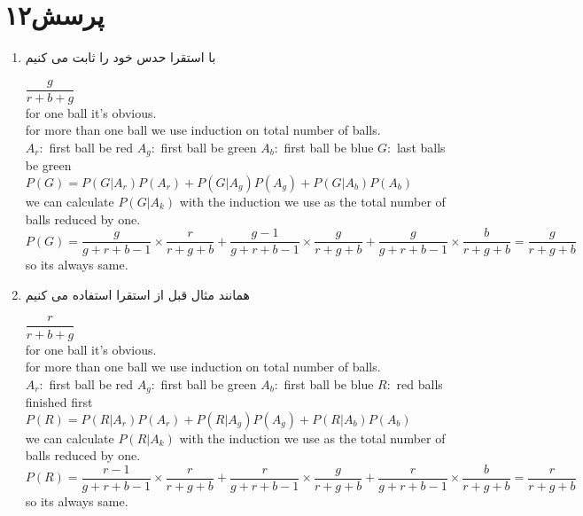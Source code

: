 \documentclass[a4paper]{article}
\begin{document}
\pagebreak
\section*{پرسش۱۲}
\begin{enumerate}
\item{}
با استقرا حدس خود را ثابت می کنیم
\begin{latin}
$\dfrac{g}{r+b+g}$\\
for one ball it's obvious.\\
for more than one ball we use induction on total number of balls.\\
$A_r: $ first ball be red
$A_g: $ first ball be green
$A_b: $ first ball be blue
$G: $ last balls be green
$P(G) = P(G|A_r)P(A_r) + P(G|A_g)P(A_g) + P(G|A_b)P(A_b)$\\
we can calculate $P(G|A_k) $ with the induction we use as the total number of balls reduced by one.\\
$P(G) = \dfrac{g}{g+r+b-1} \times \dfrac{r}{r+g+b} +  \dfrac{g-1}{g+r+b-1} \times \dfrac{g}{r+g+b} +  \dfrac{g}{g+r+b-1} \times \dfrac{b}{r+g+b} = \dfrac{g}{r+g+b}$\\
so its always same.

\end{latin}
\item{}
همانند مثال قبل از استقرا استفاده می کنیم
\begin{latin}
$\dfrac{r}{r+b+g}$\\
for one ball it's obvious.\\
for more than one ball we use induction on total number of balls.\\
$A_r: $ first ball be red
$A_g: $ first ball be green
$A_b: $ first ball be blue
$R: $ red balls finished first
$P(R) = P(R|A_r)P(A_r) + P(R|A_g)P(A_g) + P(R|A_b)P(A_b)$\\
we can calculate $P(R|A_k) $ with the induction we use as the total number of balls reduced by one.\\
$P(R) = \dfrac{r-1}{g+r+b-1} \times \dfrac{r}{r+g+b} +  \dfrac{r}{g+r+b-1} \times \dfrac{g}{r+g+b} +  \dfrac{r}{g+r+b-1} \times \dfrac{b}{r+g+b} = \dfrac{r}{r+g+b}$\\
so its always same.

\end{latin}

\end{enumerate}
\pagebreak
\end{document}
